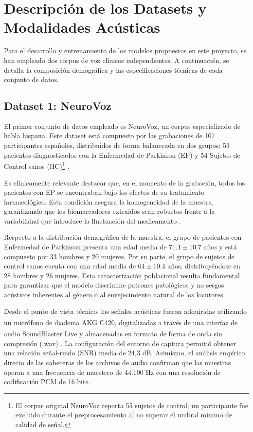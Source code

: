 \section{Descripción de los Datasets y Modalidades Acústicas}

    Para el desarrollo y entrenamiento de los modelos propuestos en este proyecto, se han empleado dos corpus de voz clínicos independientes. A continuación, se detalla la composición demográfica y las especificaciones técnicas de cada conjunto de datos.

    \subsection{Dataset 1: NeuroVoz}
        El primer conjunto de datos empleado es NeuroVoz, un corpus especializado de habla hispana. Este dataset está compuesto por las grabaciones de 107 participantes españoles, distribuidos de forma balanceada en dos grupos: 53 pacientes diagnosticados con la Enfermedad de Parkinson (EP) y 54 Sujetos de Control sanos (HC)\footnote{El corpus original NeuroVoz reporta 55 sujetos de control; un participante fue excluido durante el preprocesamiento al no superar el umbral mínimo de calidad de señal.} \cite{mendes2024}.

        Es clínicamente relevante destacar que, en el momento de la grabación, todos los pacientes con EP se encontraban bajo los efectos de su tratamiento farmacológico. Esta condición asegura la homogeneidad de la muestra, garantizando que los biomarcadores extraídos sean robustos frente a la variabilidad que introduce la fluctuación del medicamento \cite{mendes2024}.

        Respecto a la distribución demográfica de la muestra, el grupo de pacientes con Enfermedad de Parkinson presenta una edad media de $71.1 \pm 10.7$ años y está compuesto por 33 hombres y 20 mujeres. Por su parte, el grupo de sujetos de control sanos cuenta con una edad media de $64 \pm 10.4$ años, distribuyéndose en 28 hombres y 26 mujeres. Esta caracterización poblacional resulta fundamental para garantizar que el modelo discrimine patrones patológicos y no sesgos acústicos inherentes al género o al envejecimiento natural de los locutores.

        Desde el punto de vista técnico, las señales acústicas fueron adquiridas utilizando un micrófono de diadema AKG\textsuperscript{\tiny\textregistered} C420, digitalizadas a través de una interfaz de audio SoundBlaster\textsuperscript{\tiny\textregistered} Live y almacenadas en formato de forma de onda sin compresión (.wav) \cite{mendes2024}. La configuración del entorno de captura permitió obtener una relación señal-ruido (SNR) media de 24,3 dB. Asimismo, el análisis empírico directo de las cabeceras de los archivos de audio confirman que las muestras operan a una frecuencia de muestreo de 44.100 Hz con una resolución de codificación PCM de 16 bits.

